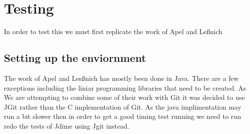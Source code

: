 
\chapter{Testing}
In order to test this we must first replicate the work of Apel and Le{\ss}nich

\section{Setting up the enviornment}
The work of Apel and Les{\ss}nich has mostly been done in Java.  There are a few exceptions including the liniar programming libraries that need to be created.  As We are attempting to combine some of their work with Git it was decided to use JGit rather than the C implementation of Git. As the java implimentation may run a bit slower then in order to get a good timing test running we need to run redo the tests of Jdime using Jgit instead. 

